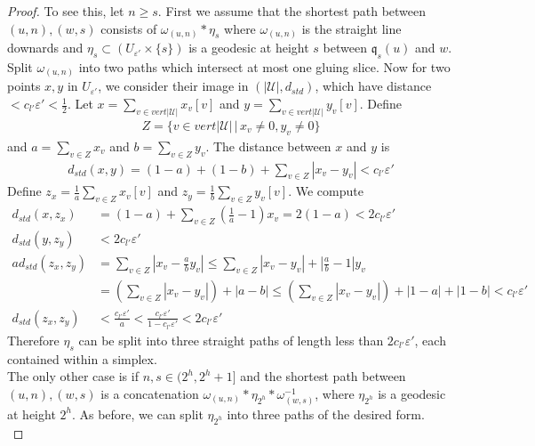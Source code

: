 \documentclass[10pt,a4paper]{amsart}
\begin{document}
\begin{proof}
To see this, let $n\geq s$. First we assume that the shortest path between $(u,n),(w,s)$ consists of $\omega_{(u,n)}\ast \eta_{s}$ where $\omega_{(u,n)}$ is the straight line downards and $\eta_{s} \subset (U_{\varepsilon'} \times \{s\})$ is a geodesic at height $s$ between $\mathfrak{q}_{s}(u)$ and $w$. Split $\omega_{(u,n)}$ into two paths which intersect at most one gluing slice. Now for two points $x,y$ in $U_{\varepsilon'}$, we consider their image in $(|\mathcal{U}|, d_{std})$, which have distance $< c_{l'}\varepsilon'<\frac{1}{2}$. Let $x = \sum_{v \in vert |\mathcal{U}|} x_{v} [v]$ and $y =  \sum_{v \in vert |\mathcal{U}|} y_{v} [v]$. Define
\begin{align*}
Z = \{v\in vert|\mathcal{U}|\,|\, x_{v}\neq 0, y_{v} \neq 0\}
\end{align*}
 and $a = \sum_{v \in Z} x_{v}$ and $b = \sum_{v \in Z} y_{v}$. The distance between $x$ and $y$ is 
\begin{align*}
d_{std}(x,y) = (1-a) + (1-b) + \sum_{v \in Z} |x_{v}-y_{v}| < c_{l'}\varepsilon'
\end{align*} 
Define $z_{x} = \frac{1}{a}\sum_{v\in Z} x_{v} [v]$ and $z_{y} = \frac{1}{b} \sum_{v\in Z} y_{v} [v]$. We compute
\begin{align*}
d_{std}(x,z_{x}) &= (1-a) + \sum_{v\in Z} (\frac{1}{a}-1) x_{v} = 2(1-a) < 2c_{l'}\varepsilon'\\
d_{std}(y,z_{y}) &< 2c_{l'}\varepsilon'\\
a d_{std}(z_{x},z_{y}) &= \sum_{v \in Z} |x_{v}-\frac{a}{b} y_{v}|\leq \sum_{v \in Z} |x_{v}- y_{v}|+ |\frac{a}{b}-1| y_{v}\\
&= (\sum_{v \in Z} |x_{v}- y_{v}|)+ |a-b| \leq (\sum_{v \in Z} |x_{v}- y_{v}|)+ |1-a| + |1-b| < c_{l'}\varepsilon'\\
d_{std}(z_{x},z_{y}) &<\frac{c_{l'}\varepsilon'}{a} <\frac{c_{l'}\varepsilon'}{1-c_{l'}\varepsilon'} <2c_{l'}\varepsilon'
\end{align*}
Therefore $\eta_{s}$ can be split into three straight paths of length less than $2c_{l'}\varepsilon'$, each contained within a simplex. \\

The only other case is if $n,s\in (2^{h},2^{h}+1]$ and the shortest path between $(u,n),(w,s)$ is a concatenation $\omega_{(u,n)} \ast \eta_{2^h} \ast \omega_{(w,s)}^{-1}$, where $\eta_{2^h}$ is a geodesic at height $2^h$. As before, we can split $\eta_{2^h}$ into three paths of the desired form.\\


\end{proof}
\end{document}
